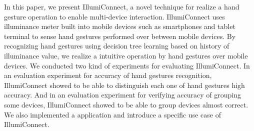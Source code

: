 In this paper, we present IllumiConnect, a novel technique for realize a hand gesture operation to enable multi-device interaction.
IllumiConnect uses illuminance meter built into mobile devices such as smartphones and tablet terminal to sense hand gestures performed over between mobile devices.
By recognizing hand gestures using decision tree learning based on  history of illuminance value, we realize a intuitive operation by hand gestures over mobile devices.
We conducted two kind of experiments for evaluating IllumiConnect.
In an evaluation experiment for accuracy of hand gestures recognition, IllumiConnect showed to be able to distinguish each one of hand gestures high accuracy.
And in an evaluation experiment for verifying accuracy of grouping some devices, IllumiConnect showed to be able to group devices almost correct.
We also implemented a application and introduce a specific use case of IllumiConnect.

\begin{comment}
  日本語
  本稿では，私たちはIllumiConnect，複数端末間のインタラクションを可能とするためのハンドジェスチャ操作を実現する新しい技術，を示す．
  IllumiConnectは，モバイル端末の上で行われたジェスチャを認識するために，スマートフォンやタブレット端末などのモバイル端末に内蔵された照度センサを用いる.
  照度値の履歴を基にした決定木学習を用いてハンドジェスチャを認識することで，私たちはモバイル端末上でのハンドジェスチャによる直感的な操作を実現す．
  私たちは，IllumiConnectを評価するために二種類の評価実験を行った．
  ハンドジェスチャ認識精度を検証するための評価実験では，IllumiConnectは高い精度でそれぞれのジェスチャを認識可能であることを示した。
  また，任意デバイスのグルーピング化の精度を検証するための評価実験では，IllumiConnectは，ほとんど正確に端末をグルーピングできることを示した．
  また，私たちは，アプリケーションを作成し, IllumiConnectの具体的な使用例を紹介する．
\end{comment}

